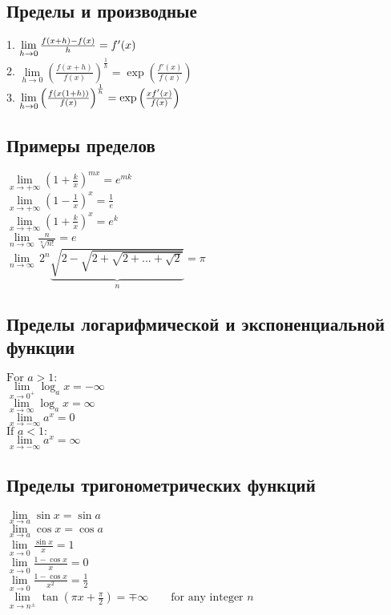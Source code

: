 \subsection{Пределы и производные }

1. $\lim\limits_{h\to 0}{f(x+h)-f(x)\over h}=f'(x)$ \\
2. $\lim\limits_{h\to0}\left(\frac{f(x+h)}{f(x)}\right)^\frac{1}{h}=\exp\left(\frac{f'(x)}{f(x)}\right)$ \\
3. $\lim\limits_{h \to 0}{ \left({f(x(1+h))\over{f(x)}}\right)^{1\over{h}} }=\exp\left(\frac{x f'(x)}{f(x)}\right)$ \\

\subsection{Примеры пределов}

$\lim\limits_{x\to+\infty} \left(1+\frac{k}{x}\right)^{mx}=e^{mk} $ \\
$\lim\limits_{x\to+\infty} \left(1-\frac{1}{x}\right)^x=\frac{1}{e} $ \\
$\lim\limits_{x\to+\infty} \left(1+\frac{k}{x}\right)^x=e^k $ \\
$\lim\limits_{n\to\infty} \frac{n}{\sqrt[n]{n!}}=e $ \\
$\lim\limits_{n\to \infty }\, 2^{n} \underbrace{\sqrt{2-\sqrt{2+\sqrt{2+\text{...} +\sqrt{2}}}}}_n= \pi $ \\

\subsection{Пределы логарифмической и экспоненциальной функции}

$\mbox{For } a > 1: \, $ \\
$\lim\limits_{x \to 0^+} \log_a x = -\infty$ \\
$\lim\limits_{x \to \infty} \log_a x = \infty$ \\
$\lim\limits_{x \to -\infty} a^x = 0 $ \\
$\mbox{If } a < 1: \, $ \\
$\lim\limits_{x \to -\infty} a^x = \infty $ \\

\subsection{Пределы тригонометрических функций}

$\lim\limits_{x \to a} \sin x = \sin a $ \\
$\lim\limits_{x \to a} \cos x = \cos a $ \\
$\lim\limits_{x \to 0} \frac{\sin x}{x} = 1 $ \\
$\lim\limits_{x \to 0} \frac{1-\cos x}{x} = 0 $ \\
$\lim\limits_{x \to 0} \frac{1-\cos x}{x^2} = \frac{1}{2} $ \\
$\lim\limits_{x \to n^\pm} \tan \left(\pi x + \frac{\pi}{2}\right) = \mp\infty \qquad \text{for any integer } n $ \\
